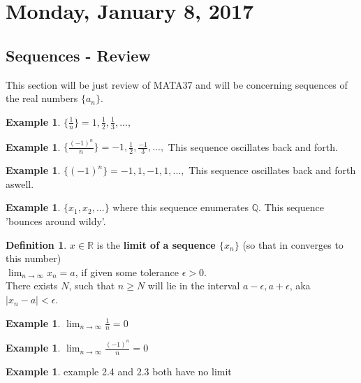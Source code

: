 \documentclass[12pt]{article}
\theoremstyle{plain}
\theoremstyle{definition}
\newtheorem{definition}[theorem]{Definition}
\newtheorem{example}[theorem]{Example}
\begin{document}
\newpage

\section{Monday, January 8, 2017}

\subsection{Sequences - Review}

This section will be just review of MATA37 and will be concerning sequences of the real numbers $\{ a_n \}$.

\begin{example}
    $\{ \frac{1}{n} \} = 1,\frac{1}{2}, \frac{1}{3}, ..., $
\end{example}

\begin{example}
    $\{ \frac{(-1)^n}{n} \} = -1,\frac{1}{2}, \frac{-1}{3}, ..., $ This sequence oscillates back and forth.
\end{example}

\begin{example}
    $\{ (-1)^n \} = -1,1,-1,1, ..., $ This sequence oscillates back and forth aswell.
\end{example}

\begin{example}
    $\{ x_1, x_2, ...  \}$ where this sequence enumerates $\mathbb{Q}$. This sequence 'bounces around wildy'.
\end{example}

\begin{definition}
    $x\in\mathbb{R}$ is the \textbf{limit of a sequence $\{x_n \}$} (so that in converges to this number)\\
    $\lim_{n\to\infty} x_n = a$, if given some tolerance $\epsilon > 0$.\\
    There exists $N$, such that $n \geq N$ will lie in the interval $a-\epsilon, a+\epsilon$, aka $|x_n - a| < \epsilon$.
\end{definition}

\begin{example}
    $\lim_{n\to\infty} \frac{1}{n} = 0$
\end{example}

\begin{example}
    $\lim_{n\to\infty} \frac{(-1)^n}{n} = 0$
\end{example}

\begin{example}
    example 2.4 and 2.3 both have no limit
\end{example}
\end{document}

